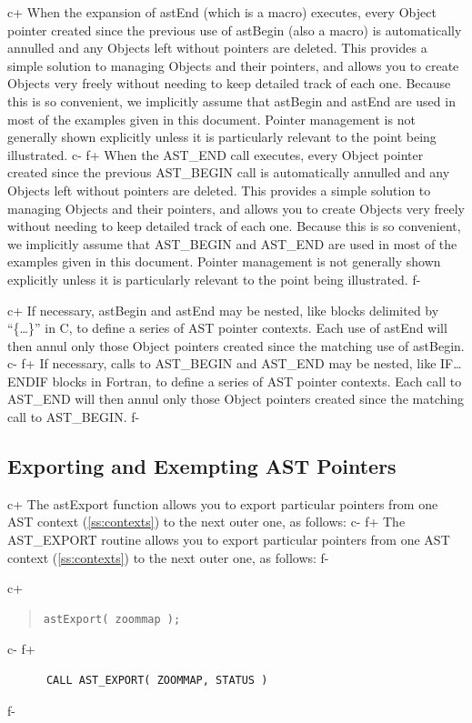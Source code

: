 \documentclass[twoside,11pt]{article}
\newcommand{\secref}[1]{\S\ref{#1}}
\renewcommand{\secref}[1]{\ref{#1}}
\begin{document}
c+
When the expansion of astEnd (which is a macro) executes, every Object
pointer created since the previous use of astBegin (also a macro) is
automatically annulled and any Objects left without pointers are
deleted. This provides a simple solution to managing Objects and their
pointers, and allows you to create Objects very freely without needing
to keep detailed track of each one.  Because this is so convenient, we
implicitly assume that astBegin and astEnd are used in most of the
examples given in this document.  Pointer management is not generally
shown explicitly unless it is particularly relevant to the point being
illustrated.
c-
f+
When the AST\_END call executes, every Object pointer created since
the previous AST\_BEGIN call is automatically annulled and any Objects
left without pointers are deleted. This provides a simple solution to
managing Objects and their pointers, and allows you to create Objects
very freely without needing to keep detailed track of each one.
Because this is so convenient, we implicitly assume that AST\_BEGIN
and AST\_END are used in most of the examples given in this document.
Pointer management is not generally shown explicitly unless it is
particularly relevant to the point being illustrated.
f-

c+
If necessary, astBegin and astEnd may be nested, like blocks delimited
by ``\{\ldots\}'' in C, to define a series of AST pointer
contexts. Each use of astEnd will then annul only those Object
pointers created since the matching use of astBegin.
c-
f+
If necessary, calls to AST\_BEGIN and AST\_END may be nested, like
IF\ldots ENDIF blocks in Fortran, to define a series of AST pointer
contexts. Each call to AST\_END will then annul only those Object
pointers created since the matching call to AST\_BEGIN.
f-

\subsection{Exporting and Exempting AST Pointers}
c+
The astExport function allows you to export particular pointers from
one AST context (\secref{ss:contexts}) to the next outer one, as
follows:
c-
f+
The AST\_EXPORT routine allows you to export particular pointers from
one AST context (\secref{ss:contexts}) to the next outer one, as
follows:
f-

c+
\begin{quote}
\small
\begin{verbatim}
astExport( zoommap );
\end{verbatim}
\normalsize
\end{quote}
c-
f+
\small
\begin{verbatim}
      CALL AST_EXPORT( ZOOMMAP, STATUS )
\end{verbatim}
\normalsize
f-
\end{document}
